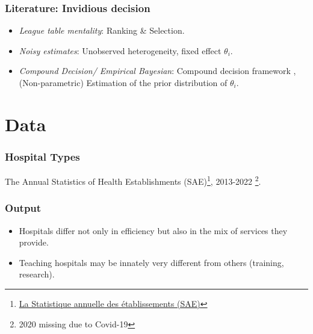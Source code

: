 \documentclass[10pt,mathserif,aspectratio=169]{beamer}
\begin{document}
\begin{frame}
  \frametitle{Literature: Invidious decision}
  \begin{itemize}\itemsep=12pt
    \item \textit{League table mentality}: Ranking \& Selection.\citep{gu2023invidious}
    \item \textit{Noisy estimates}: Unobserved heterogeneity, fixed effect $\theta_i$. \citep{chetty2014measuring,kline2022systemic}
    \item \textit{Compound Decision/ Empirical Bayesian}: Compound decision framework \citep{robbins1956empirical}, (Non-parametric) Estimation of the prior distribution of $\theta_i$. \citep{koenker2014convex, gu2017empirical}
  \end{itemize}
\end{frame}

\section{Data}

\begin{frame}
  \frametitle{Hospital Types}
  The Annual Statistics of Health
  Establishments
  (SAE)\footnote{\href{https://data.drees.solidarites-sante.gouv.fr/explore/dataset/708_bases-statistiques-sae/information/}{La
      Statistique annuelle des établissements (SAE)}}, 2013-2022 \footnote{2020 missing due to Covid-19}.
  \begin{table}
    \fontsize{10pt}{10pt}\selectfont
    
  \end{table}
\end{frame}

\begin{frame}[label=output]
  \frametitle{Output}
  \begin{table} \fontsize{8pt}{10pt}\selectfont
    
  \end{table}
  \begin{itemize}\itemsep = 8pt
    \item Hospitals differ not only in efficiency but also in the mix of services they
          provide.
    \item Teaching hospitals may be innately very different from others (training,
          research).
  \end{itemize}
  \hyperlink{reg_sep}{}
\end{frame}
\end{document}
